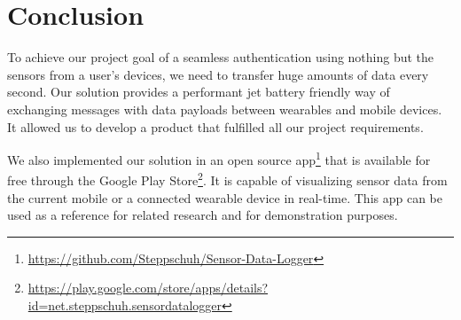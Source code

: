 \section{Conclusion}
\label{sec:conclusion}

To achieve our project goal of a seamless authentication using nothing but the sensors from a user's devices, we need to transfer huge amounts of data every second.
Our solution provides a performant jet battery friendly way of exchanging messages with data payloads between wearables and mobile devices.
It allowed us to develop a product that fulfilled all our project requirements.

We also implemented our solution in an open source app\footnote{\href{https://github.com/Steppschuh/Sensor-Data-Logger}{https://github.com/Steppschuh/Sensor-Data-Logger}} that is available for free through the Google Play Store\footnote{\href{https://play.google.com/store/apps/details?id=net.steppschuh.sensordatalogger}{https://play.google.com/store/apps/details?id=net.steppschuh.sensordatalogger}}.
It is capable of visualizing sensor data from the current mobile or a connected wearable device in real-time.
This app can be used as a reference for related research and for demonstration purposes.

\clearpage